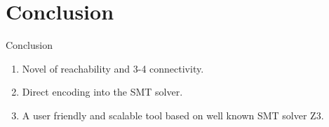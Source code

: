 \documentclass{beamer}
\theoremstyle{definition}
\theoremstyle{remark}
\begin{document}
% 
% 

\section{Conclusion}
	
    \begin{frame}{Conclusion}
            \begin{enumerate}
            \item Novel {\color{red}{encodings}} of reachability and 3-4 connectivity.
             \item Direct encoding into the SMT solver.
            \item A user friendly and scalable tool based on well known SMT solver Z3.
            \end{enumerate}
	\end{frame}

\end{document}
